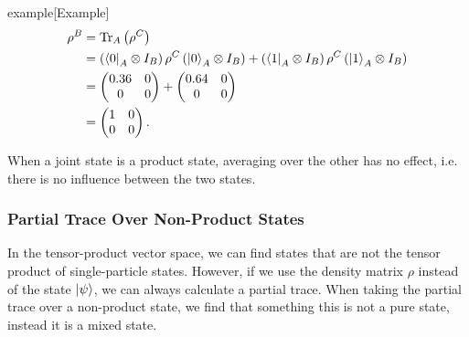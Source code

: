 \documentclass{article}
\begin{document}
\begin{callout}{example}[Example]
\begin{align*}
    \rho ^B &= \text{Tr}_A \left( \rho ^C \right) \\
            &=\left( \bra{0}_A\otimes I_B \right)\rho ^C \left( \ket{0}_A\otimes I_B \right)+\left( \bra{1}_A\otimes I_B \right)\rho ^C \left( \ket{1}_A\otimes I_B \right) \\
            &=\begin{pmatrix}
                0.36&0\\0&0
            \end{pmatrix} +\begin{pmatrix}
                0.64&0\\0&0
            \end{pmatrix} \\
            &=\begin{pmatrix}
                1&0\\0&0
            \end{pmatrix}.
\end{align*}
\end{callout}
When a joint state is a product state, averaging over the other has no effect, i.e. there is no influence between the two states.

\subsubsection{Partial Trace Over Non-Product States}
In the tensor-product vector space, we can find states that are not the tensor product of single-particle states. However, if we use the density matrix $\rho $ instead of the state $\ket{\psi }$, we can always calculate a partial trace. When taking the partial trace over a non-product state, we find that something this is not a pure state, instead it is a mixed state.
\end{document}
